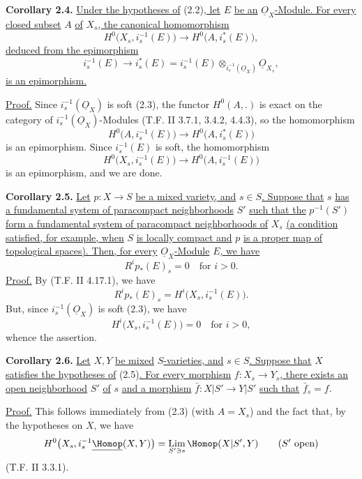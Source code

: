 \textbf{Corollary 2.4.} \uline{Under the hypotheses of} (2.2)\uline{, let} $E$ \uline{be an} $\underline{O}_X$\uline{-Module. For every closed subset} $A$ \uline{of} $X_s$\uline{, the canonical homomorphism}
\[
  H^0\bigl(X_s,i_s^{-1}(E)\bigr)
  \longrightarrow
  H^0\bigl(A,i_s^*(E)\bigr),
\]
\uline{deduced from the epimorphism}
\[
  i_s^{-1}(E)\longrightarrow i_s^*(E)
  =i_s^{-1}(E)\otimes_{i_s^{-1}(\underline{O}_X)}\underline{O}_{X_s},
\]
\uline{is an epimorphism.}

\uline{Proof.} Since $i_s^{-1}(\underline{O}_X)$ is soft (2.3), the functor $H^0(A,.)$ is exact on the category of $i_s^{-1}(\underline{O}_X)$-Modules (T.F. II 3.7.1, 3.4.2, 4.4.3), so the homomorphism
\[
  H^0\bigl(A,i_s^{-1}(E)\bigr)
  \longrightarrow
  H^0\bigl(A,i_s^*(E)\bigr)
\]
is an epimorphism. Since $i_s^{-1}(E)$ is soft, the homomorphism
\[
  H^0\bigl(X_s,i_s^{-1}(E)\bigr)
  \longrightarrow
  H^0\bigl(A,i_s^{-1}(E)\bigr)
\]
is an epimorphism, and we are done.

\textbf{Corollary 2.5.} \uline{Let} $p:X\to S$ \uline{be a mixed variety, and} $s\in S$\uline{. Suppose that} $s$ \uline{has a fundamental system of paracompact neighborhoods} $S'$ \uline{such that the} $p^{-1}(S')$ \uline{form a fundamental system of paracompact neighborhoods of} $X_s$ \uline{(a condition satisfied, for example, when} $S$ \uline{is locally compact and} $p$ \uline{is a proper map of topological spaces). Then, for every} $\underline{O}_X$\uline{-Module} $E$\uline{, we have}
\[
  R^i p_*(E)_s=0 \quad \text{for } i>0.
\]
%
\uline{Proof.} By (T.F. II 4.17.1), we have
\[
  R^i p_*(E)_s=H^i\bigl(X_s,i_s^{-1}(E)\bigr).
\]
But, since $i_s^{-1}(\underline{O}_X)$ is soft (2.3), we have
\[
  H^i\bigl(X_s,i_s^{-1}(E)\bigr)=0\quad \text{for } i>0,
\]
whence the assertion.

\textbf{Corollary 2.6.} \uline{Let} $X,Y$ \uline{be mixed} $S$\uline{-varieties, and} $s\in S$\uline{. Suppose that} $X$ \uline{satisfies the hypotheses of} (2.5)\uline{. For every morphism} $f:X_s\to Y_s$\uline{, there exists an open neighborhood} $S'$ \uline{of} $s$ \uline{and a morphism} $\bar f:X|S'\longrightarrow Y|S'$ \uline{such that} $\bar f_s=f$.

\uline{Proof.} This follows immediately from (2.3) (with $A=X_s$) and the fact that, by the hypotheses on $X$, we have
\[
  H^0\bigl(X_s,i_s^{-1}\underline{\Homop}(X,Y)\bigr)
  =\operatorname*{Lim}_{S'\ni s}\Homop(X|S',Y)\qquad (S'\ \text{open})
\]
(T.F. II 3.3.1).

